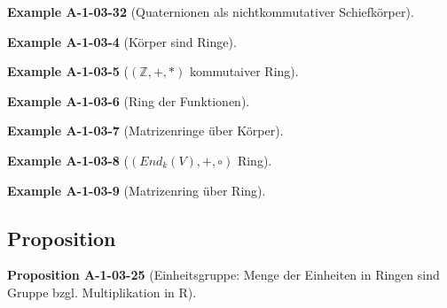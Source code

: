 \documentclass[10pt, letterpaper]{article}
\newcommand{\CustomHeading}[3]{%
  \par\medskip\noindent%
  \textbf{#1 #2} \textnormal{(#3)}.\enskip%
}
\newenvironment{PROP}[2]{\CustomHeading{Proposition}{#1}{#2}}{}
\newenvironment{EXA}[2]{\CustomHeading{Example}{#1}{#2}}{}
\begin{document}
\begin{EXA}{A-1-03-32}{Quaternionen als nichtkommutativer Schiefkörper}

\end{EXA}

\begin{EXA}{A-1-03-4}{Körper sind Ringe}

\end{EXA}

\begin{EXA}{A-1-03-5}{$(\mathbb{Z},+,*)$ kommutaiver Ring}

\end{EXA}

\begin{EXA}{A-1-03-6}{Ring der Funktionen}

\end{EXA}

\begin{EXA}{A-1-03-7}{Matrizenringe über Körper}

\end{EXA}

\begin{EXA}{A-1-03-8}{$(End_k(V),+,\circ)$ Ring}

\end{EXA}

\begin{EXA}{A-1-03-9}{Matrizenring über Ring}

\end{EXA}

































\subsection{Proposition}



\begin{PROP}{A-1-03-25}{Einheitsgruppe: Menge der Einheiten in Ringen sind Gruppe bzgl. Multiplikation in R}

\end{PROP}
\end{document}
